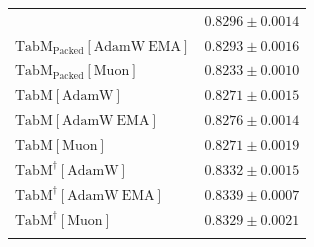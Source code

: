 \begin{longtable}{p{}p{}}
{\begin{tabular}{ll}
{\footnotesize $\mathrm{TabM_{\text{Packed}}[AdamW]}$ } & {\footnotesize$0.8296 \pm 0.0014$}\\ 
{\footnotesize $\mathrm{TabM_{\text{Packed}}[AdamW\ EMA]}$ } & {\footnotesize$0.8293 \pm 0.0016$}\\ 
{\footnotesize $\mathrm{TabM_{\text{Packed}}[Muon]}$ } & {\footnotesize$0.8233 \pm 0.0010$}\\ 
{\footnotesize $\mathrm{TabM[AdamW]}$ } & {\footnotesize$0.8271 \pm 0.0015$}\\ 
{\footnotesize $\mathrm{TabM[AdamW\ EMA]}$ } & {\footnotesize$0.8276 \pm 0.0014$}\\ 
{\footnotesize $\mathrm{TabM[Muon]}$ } & {\footnotesize$0.8271 \pm 0.0019$}\\ 
{\footnotesize $\mathrm{TabM^\dagger[AdamW]}$ } & {\footnotesize$0.8332 \pm 0.0015$}\\ 
{\footnotesize $\mathrm{TabM^\dagger[AdamW\ EMA]}$ } & {\footnotesize$0.8339 \pm 0.0007$}\\ 
{\footnotesize $\mathrm{TabM^\dagger[Muon]}$ } & {\footnotesize$0.8329 \pm 0.0021$}\\ 
\bottomrule
\end{tabular}}

&

\topalign{
\centering
\setlength\tabcolsep{2.5pt}
\renewcommand{\arraystretch}{0.8}
\begin{tabular}{ll}


\end{tabular}}
\end{longtable}
